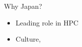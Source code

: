\begin{frame}{Why Japan?}
	
	\begin{itemize}
		\item Leading role in HPC
		\item Culture, 
	\end{itemize}

	
\end{frame}